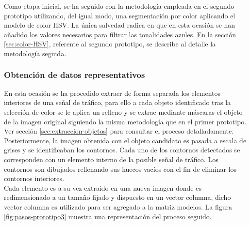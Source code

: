 Como etapa inicial, se ha seguido con la metodología empleada en el segundo prototipo utilizando, del igual modo, una segmentación por color aplicando el modelo de color HSV. La única salvedad radica en que en esta ocasión se han añadido los valores necesarios para filtrar las tonalidades azules. En la sección \ref{sec:color-HSV}, referente al segundo prototipo, se describe al detalle la metodología seguida.

\subsubsection{Obtención de datos representativos}

En esta ocasión se ha procedido extraer de forma separada los elementos interiores de una señal de tráfico, para ello a cada objeto identificado tras la selección de color se le aplica un relleno y se extrae mediante máscaras el objeto de la imagen original siguiendo la misma metodología que en el primer prototipo. Ver sección \ref{sec:extraccion-objetos} para consultar el proceso detalladamente.\\

Posteriormente, la imagen obtenida con el objeto candidato es pasada a escala de grises y se identificaban los contornos. Cada uno de los contornos detectados se corresponden con un elemento interno de la posible señal de tráfico. Los contornos son dibujados rellenando sus huecos vacíos con el fin de eliminar los contornos interiores.\\

Cada elemento es a su vez extraído en una nueva imagen donde es redimensionado a un tamaño fijado y dispuesto en un vector columna, dicho vector columna es utilizado para ser agregado a la matriz modelos. La figura \ref{fig:pasos-prototipo3} muestra una representación del proceso seguido. \\


